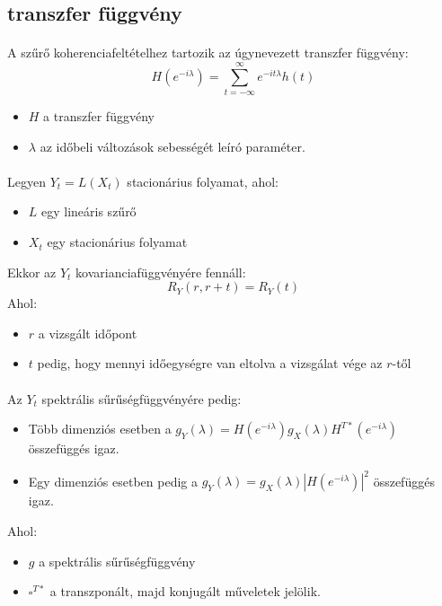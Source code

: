 \documentclass[11pt,a4pape,draftr]{article}
\begin{document}
				\subsection{transzfer függvény}
					\paragraph{}
						A szűrő koherenciafeltételhez tartozik az úgynevezett transzfer függvény:
						$$H \left(e^{-i \lambda} \right) = \sum_{t = -\infty}^{\infty} e^{-i t \lambda} h(t)$$
						\begin{itemize}
						    \item $H$ a transzfer függvény
						    \item $\lambda$ az időbeli változások sebességét leíró paraméter.
						\end{itemize}
					\paragraph{}
						Legyen $Y_t = L(X_t)$ stacionárius folyamat, ahol:
						\begin{itemize}
						    \item $L$ egy lineáris szűrő
						    \item $X_t$ egy stacionárius folyamat
						\end{itemize}
						
						Ekkor az $Y_t$ kovarianciafüggvényére fennáll:
						$$R_Y(r,r+t) = R_Y(t)$$
						Ahol:
						\begin{itemize}
						    \item $r$ a vizsgált időpont
						    \item $t$ pedig, hogy mennyi időegységre van eltolva a vizsgálat vége az $r$-től
						\end{itemize}
					\paragraph{}
						Az $Y_t$ spektrális sűrűségfüggvényére pedig:
						\begin{itemize}
						    \item Több dimenziós esetben a $g_Y(\lambda) = H\left(e^{-i \lambda} \right)g_X(\lambda)H^{T*}\left(e^{-i \lambda} \right)$ összefüggés igaz.
						    \item Egy dimenziós esetben pedig a $g_Y(\lambda) = g_X(\lambda)\left|H\left(e^{-i \lambda} \right)\right|^2$ összefüggés igaz.
						\end{itemize}
						Ahol:
						\begin{itemize}
						    \item $g$ a spektrális sűrűségfüggvény
						    \item $\square^{T*}$ a transzponált, majd konjugált műveletek jelölik.
						\end{itemize}
\end{document}
